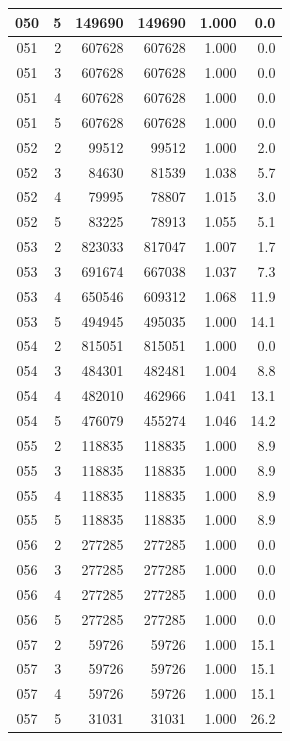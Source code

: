 \begin{longtable}{|c|r|r|r|r|r|}
\hline
050 & 5 & 149690 & 149690 & 1.000 & 0.0 \\
\hline
051 & 2 & 607628 & 607628 & 1.000 & 0.0 \\
\hline
051 & 3 & 607628 & 607628 & 1.000 & 0.0 \\
\hline
051 & 4 & 607628 & 607628 & 1.000 & 0.0 \\
\hline
051 & 5 & 607628 & 607628 & 1.000 & 0.0 \\
\hline
052 & 2 & 99512 & 99512 & 1.000 & 2.0 \\
\hline
052 & 3 & 84630 & 81539 & 1.038 & 5.7 \\
\hline
052 & 4 & 79995 & 78807 & 1.015 & 3.0 \\
\hline
052 & 5 & 83225 & 78913 & 1.055 & 5.1 \\
\hline
053 & 2 & 823033 & 817047 & 1.007 & 1.7 \\
\hline
053 & 3 & 691674 & 667038 & 1.037 & 7.3 \\
\hline
053 & 4 & 650546 & 609312 & 1.068 & 11.9 \\
\hline
053 & 5 & 494945 & 495035 & 1.000 & 14.1 \\
\hline
054 & 2 & 815051 & 815051 & 1.000 & 0.0 \\
\hline
054 & 3 & 484301 & 482481 & 1.004 & 8.8 \\
\hline
054 & 4 & 482010 & 462966 & 1.041 & 13.1 \\
\hline
054 & 5 & 476079 & 455274 & 1.046 & 14.2 \\
\hline
055 & 2 & 118835 & 118835 & 1.000 & 8.9 \\
\hline
055 & 3 & 118835 & 118835 & 1.000 & 8.9 \\
\hline
055 & 4 & 118835 & 118835 & 1.000 & 8.9 \\
\hline
055 & 5 & 118835 & 118835 & 1.000 & 8.9 \\
\hline
056 & 2 & 277285 & 277285 & 1.000 & 0.0 \\
\hline
056 & 3 & 277285 & 277285 & 1.000 & 0.0 \\
\hline
056 & 4 & 277285 & 277285 & 1.000 & 0.0 \\
\hline
056 & 5 & 277285 & 277285 & 1.000 & 0.0 \\
\hline
057 & 2 & 59726 & 59726 & 1.000 & 15.1 \\
\hline
057 & 3 & 59726 & 59726 & 1.000 & 15.1 \\
\hline
057 & 4 & 59726 & 59726 & 1.000 & 15.1 \\
\hline
057 & 5 & 31031 & 31031 & 1.000 & 26.2 \\

\end{longtable}
